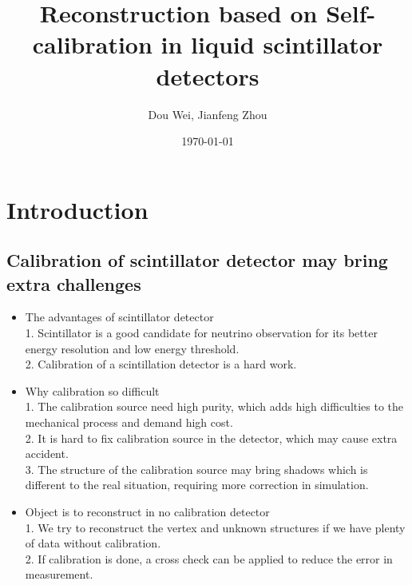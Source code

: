 \documentclass{article}
\title{Reconstruction based on Self-calibration in liquid scintillator detectors}
\author{Dou Wei, Jianfeng Zhou}
\date{\today}
\begin{document}
\maketitle
\abstract{}
\section{Introduction}
\subsection{Calibration of scintillator detector may bring extra challenges}
\begin{itemize}
\item {The advantages of scintillator detector} \\
1. Scintillator is a good candidate for neutrino observation for its better energy resolution and low energy threshold.\\
2. Calibration of a scintillation detector is a hard work.
\item {Why calibration so difficult} \\
1. The calibration source need high purity, which adds high difficulties to the mechanical process and demand high cost. \\
2. It is hard to fix calibration source in the detector, which may cause extra accident. \\
3. The structure of the calibration source may bring shadows which is different to the real situation, requiring more correction in simulation.
\item {Object is to reconstruct in no calibration detector} \\
1.  We try to reconstruct the vertex and unknown structures if we have plenty of data without calibration.\\
2.  If calibration is done, a cross check can be applied to reduce the error in measurement.\\
\end{itemize} 
\end{document}
